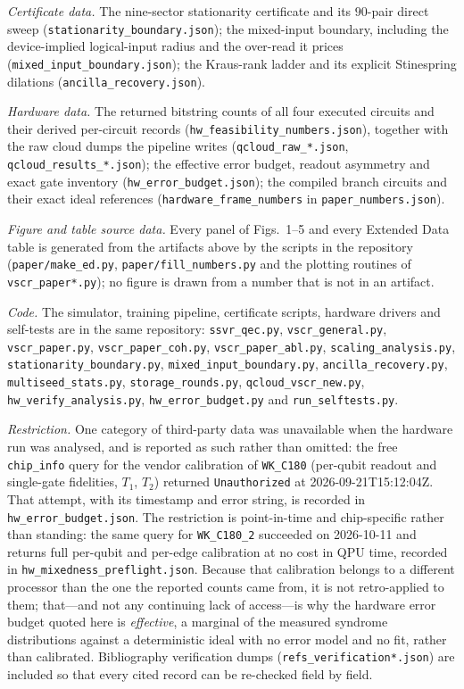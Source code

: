 \documentclass[aps,prxquantum,reprint,superscriptaddress]{revtex4-2}
\begin{document}
\emph{Certificate data.} The nine-sector stationarity certificate and its
$90$-pair direct sweep (\texttt{stationarity\_boundary.json}); the mixed-input
boundary, including the device-implied logical-input radius and the over-read it
prices (\texttt{mixed\_input\_boundary.json}); the Kraus-rank ladder and its
explicit Stinespring dilations (\texttt{ancilla\_recovery.json}).

\emph{Hardware data.} The returned bitstring counts of all four executed circuits
and their derived per-circuit records (\texttt{hw\_feasibility\_numbers.json}),
together with the raw cloud dumps the pipeline writes
(\texttt{qcloud\_raw\_*.json}, \texttt{qcloud\_results\_*.json}); the effective
error budget, readout asymmetry and exact gate inventory
(\texttt{hw\_error\_budget.json}); the compiled branch circuits and their exact
ideal references (\texttt{hardware\_frame\_numbers} in
\texttt{paper\_numbers.json}).

\emph{Figure and table source data.} Every panel of Figs.~1--5 and every Extended
Data table is generated from the artifacts above by the scripts in the repository
(\texttt{paper/make\_ed.py}, \texttt{paper/fill\_numbers.py} and the plotting
routines of \texttt{vscr\_paper*.py}); no figure is drawn from a number that is not
in an artifact.

\emph{Code.} The simulator, training pipeline, certificate scripts, hardware
drivers and self-tests are in the same repository: \texttt{ssvr\_qec.py},
\texttt{vscr\_general.py}, \texttt{vscr\_paper.py}, \texttt{vscr\_paper\_coh.py},
\texttt{vscr\_paper\_abl.py}, \texttt{scaling\_analysis.py},
\texttt{stationarity\_boundary.py}, \texttt{mixed\_input\_boundary.py},
\texttt{ancilla\_recovery.py}, \texttt{multiseed\_stats.py},
\texttt{storage\_rounds.py}, \texttt{qcloud\_vscr\_new.py},
\texttt{hw\_verify\_analysis.py}, \texttt{hw\_error\_budget.py} and
\texttt{run\_selftests.py}.

\emph{Restriction.} One category of third-party data was unavailable when the
hardware run was analysed, and is reported as such rather than omitted: the free
\texttt{chip\_info} query for the vendor calibration of \texttt{WK\_C180}
(per-qubit readout and single-gate fidelities, $T_1$, $T_2$) returned
\texttt{Unauthorized} at 2026-09-21T15:12:04Z. That attempt, with its timestamp
and error string, is recorded in \texttt{hw\_error\_budget.json}. The restriction
is point-in-time and chip-specific rather than standing: the same query for
\texttt{WK\_C180\_2} succeeded on 2026-10-11 and returns full per-qubit and
per-edge calibration at no cost in QPU time, recorded in
\texttt{hw\_mixedness\_preflight.json}. Because that calibration belongs to a
different processor than the one the reported counts came from, it is not
retro-applied to them; that---and not any continuing lack of access---is why the
hardware error budget quoted here is \emph{effective}, a marginal of the measured
syndrome distributions against a deterministic ideal with no error model and no
fit, rather than calibrated. Bibliography verification dumps
(\texttt{refs\_verification*.json}) are included so that every cited record can be
re-checked field by field.



\end{document}
